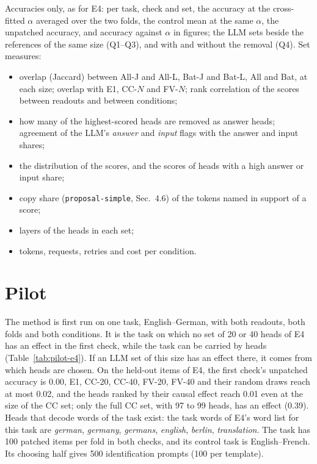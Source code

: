 \documentclass[11pt,a4paper]{article}
\newcommand{\simple}[1]{\texttt{proposal-simple}, #1}
\begin{document}
Accuracies only, as for E4: per task, check and set, the accuracy at the cross-fitted $\alpha$ averaged over the two folds, the control mean at the same $\alpha$, the unpatched accuracy, and accuracy against $\alpha$ in figures; the LLM sets beside the references of the same size (Q1--Q3), and with and without the removal (Q4). Set measures:
\begin{itemize}
  \item overlap (Jaccard) between All-J and All-L, Bat-J and Bat-L, All and Bat, at each size; overlap with E1, CC-$N$ and FV-$N$; rank correlation of the scores between readouts and between conditions;
  \item how many of the highest-scored heads are removed as answer heads; agreement of the LLM's \emph{answer} and \emph{input} flags with the answer and input shares;
  \item the distribution of the scores, and the scores of heads with a high answer or input share;
  \item copy share (\simple{Sec.~4.6}) of the tokens named in support of a score;
  \item layers of the heads in each set;
  \item tokens, requests, retries and cost per condition.
\end{itemize}

\section{Pilot}\label{sec:pilot}

The method is first run on one task, English--German, with both readouts, both folds and both conditions. It is the task on which no set of 20 or 40 heads of E4 has an effect in the first check, while the task can be carried by heads (Table~\ref{tab:pilot-e4}). If an LLM set of this size has an effect there, it comes from which heads are chosen. On the held-out items of E4, the first check's unpatched accuracy is 0.00, E1, CC-20, CC-40, FV-20, FV-40 and their random draws reach at most 0.02, and the heads ranked by their causal effect reach 0.01 even at the size of the CC set; only the full CC set, with 97 to 99 heads, has an effect (0.39). Heads that decode words of the task exist: the task words of E4's word list for this task are \emph{german}, \emph{germany}, \emph{germans}, \emph{english}, \emph{berlin}, \emph{translation}. The task has 100 patched items per fold in both checks, and its control task is English--French. Its choosing half gives 500 identification prompts (100 per template).
\end{document}
